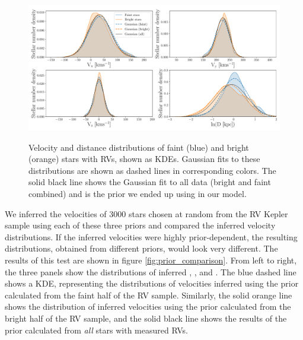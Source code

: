 \begin{figure}[ht!]
\caption{
    Velocity and distance distributions of faint (blue) and bright (orange)
    stars with RVs, shown as KDEs.
    Gaussian fits to these distributions are shown as dashed lines in
    corresponding colors.
    The solid black line shows the Gaussian fit to all data (bright and faint
    combined) and is the prior we ended up using in our model.
}
  \centering
    \includegraphics[width=1\textwidth]{prior_distributions}
\label{fig:prior_distributions}
\end{figure}
We inferred the velocities of 3000 stars chosen at random from the
RV Kepler sample using each of these three priors and compared the
inferred velocity distributions.
If the inferred velocities were highly prior-dependent, the resulting
distributions, obtained from different priors, would look very different.
The results of this test are shown in figure \ref{fig:prior_comparison}.
From left to right, the three panels show the distributions of inferred \vx,
\vy, and \vz.
The blue dashed line shows a KDE, representing the distributions of velocities
inferred using the prior calculated from the faint half of the RV sample.
Similarly, the solid orange line shows the distribution of inferred velocities
using the prior calculated from the bright half of the RV sample, and the
solid black line shows the results of the prior calculated from {\it all}
stars with measured RVs.


